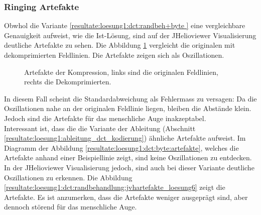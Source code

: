 \subsubsection{Ringing Artefakte}\label{resultate:loesung1:ringing}
Obwhol die Variante \ref{resultate:loesung1:dct:randbeh+byte } eine vergleichbare Genauigkeit aufweist, wie die Ist-Lösung, sind auf der JHelioviewer Visualisierung deutliche Artefakte zu sehen. Die Abbildung \ref{resultate:loesung1:dct:randbehandlung:jvhartefakte} vergleicht die originalen mit dekomprimierten Feldlinien. Die Artefakte zeigen sich als Oszillationen.
\begin{figure}[!htbp]
	\center
	\caption{Artefakte der Kompression, links sind die originalen Feldlinien, rechts die Dekomprimierten.}
	\label{resultate:loesung1:dct:randbehandlung:jvhartefakte}
\end{figure} 
In diesem Fall scheint die Standardabweichung als Fehlermass zu versagen: Da die Oszillationen nahe an der originalen Feldlinie liegen, bleiben die Abstände klein. Jedoch sind die Artefakte für das menschliche Auge inakzeptabel.\\
Interessant ist, dass die die Variante der Ableitung (Abschnitt \ref{resultate:loesung1:ableitung_dct_kodierung}) ähnliche Artefakte aufweist. Im Diagramm der Abbildung \ref{resultate:loesung1:dct:byte:artefakte}, welches die Artefakte anhand einer Beispiellinie zeigt, sind keine Oszillationen zu entdecken. In der JHelioviewer Visualisierung jedoch, sind auch bei dieser Variante deutliche Oszillationen zu erkennen. Die Abbildung \ref{resultate:loesung1:dct:randbehandlung:jvhartefakte_loesung6} zeigt die Artefakte. Es ist anzumerken, dass die Artefakte weniger ausgeprägt sind, aber dennoch störend für das menschliche Auge.\\
